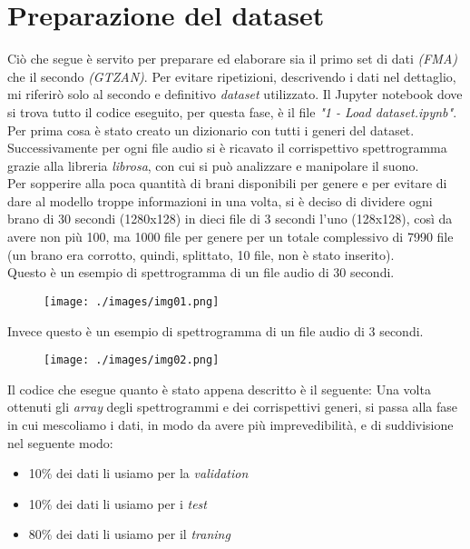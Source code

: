 \section{Preparazione del dataset}
Ciò che segue è servito per preparare ed elaborare sia il primo set di dati \textit{(FMA)} che il secondo \textit{(GTZAN)}. Per evitare ripetizioni, descrivendo i dati nel dettaglio, mi riferirò solo al secondo e definitivo \textit{dataset} utilizzato. Il Jupyter notebook dove si trova tutto il codice eseguito, per questa fase, è il file \textit{"1 - Load dataset.ipynb"}.\\
\newline
Per prima cosa è stato creato un dizionario con tutti i generi del dataset. Successivamente per ogni file audio si è ricavato il corrispettivo spettrogramma grazie alla libreria \textit{librosa}, con cui si può analizzare e manipolare il suono.\\ Per sopperire alla poca quantità di brani disponibili per genere e per evitare  di dare al modello troppe informazioni in una volta, si è deciso di dividere ogni brano di 30 secondi (1280x128) in dieci file di 3 secondi l'uno (128x128), così da avere non più 100, ma 1000 file per genere per un totale complessivo di 7990 file (un brano era corrotto, quindi, splittato, 10 file, non è stato inserito).\\
\newline Questo è un esempio di spettrogramma di un file audio di 30 secondi.
\begin{figure}[H]
	\centering
	\texttt{[image: ./images/img01.png]}
\end{figure}
\noindent Invece questo è un esempio di spettrogramma di un file audio di 3 secondi.
\begin{figure}[H]
	\centering
	\texttt{[image: ./images/img02.png]}
\end{figure}
\noindent Il codice che esegue quanto è stato appena descritto è il seguente:
\vspace*{2ex}
\vspace*{2ex}
\noindent Una volta ottenuti gli \textit{array} degli spettrogrammi e dei corrispettivi generi, si passa alla fase in cui mescoliamo i dati, in modo da avere più imprevedibilità, e di suddivisione nel seguente modo:
\begin{itemize}
	\item 10\% dei dati li usiamo per la \textit{validation}
	\item 10\% dei dati li usiamo per i \textit{test}
	\item 80\% dei dati li usiamo per il \textit{traning}
\end{itemize}
